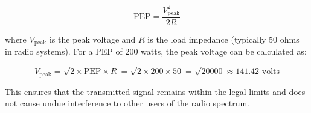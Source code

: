 \[
\text{PEP} = \frac{V_{\text{peak}}^2}{2R}
\]

where \( V_{\text{peak}} \) is the peak voltage and \( R \) is the load impedance (typically 50 ohms in radio systems). For a PEP of 200 watts, the peak voltage can be calculated as:

\[
V_{\text{peak}} = \sqrt{2 \times \text{PEP} \times R} = \sqrt{2 \times 200 \times 50} = \sqrt{20000} \approx 141.42 \text{ volts}
\]

This ensures that the transmitted signal remains within the legal limits and does not cause undue interference to other users of the radio spectrum.

